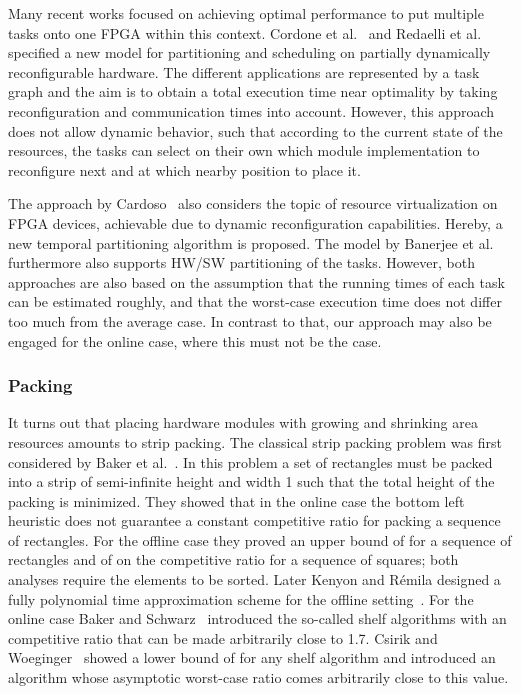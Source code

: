 \documentclass[10pt,journal]{IEEEtran}
\begin{document}
Many recent works focused on achieving optimal performance to put
multiple tasks onto one FPGA within this context.
Cordone et al.~\cite{crrss-pstgp-09} and
Redaelli et al.~\cite{rss-tscpa-08} specified a new model for
partitioning and scheduling on partially dynamically reconfigurable
hardware. The different applications are represented by a
task graph and the aim is to obtain a total execution time near
optimality by taking reconfiguration and communication times into
account. However, this approach does not allow dynamic behavior, such
that according to the current state of the resources, the tasks can
select on their own which module implementation to reconfigure next
and at which nearby position to place it.

The approach by Cardoso~\cite{c-ctpsf-03}  also considers the topic of
resource  virtualization on  FPGA devices,  achievable due  to dynamic
reconfiguration  capabilities.  Hereby,  a new  temporal  partitioning
algorithm    is     proposed.    The    model     by    Banerjee    et
al.~\cite{bbd-ipchs-06}  furthermore also supports  HW/SW partitioning
of  the  tasks.  However,  both  approaches  are  also  based  on  the
assumption  that the  running  times  of each  task  can be  estimated
roughly, and  that the worst-case  execution time does not  differ too
much from the average case. In contrast to that, our approach may also
be engaged for the online case, where this must not be the case.

\subsubsection{Packing}

It turns out that placing hardware modules with growing and shrinking
area resources amounts to strip packing. The classical strip packing
problem was first considered by Baker et al.~\cite{bcr-optd-80}. In
this problem a set of rectangles must be packed into a strip of
semi-infinite height and width 1 such that the total height of the
packing is minimized. They showed that in the online case the bottom
left heuristic does not guarantee a constant competitive
ratio for packing a sequence of rectangles.  For the offline case they proved
an upper bound of  for a sequence of rectangles and of  on the
competitive ratio for a sequence of squares; both analyses require the
elements to be sorted. Later Kenyon and R{\'e}mila designed a fully
polynomial time approximation scheme for the offline
setting~\cite{kr-asp-96}. For the online case Baker and
Schwarz~\cite{BakSch83} introduced the so-called shelf algorithms with
an competitive ratio that can be made arbitrarily close to 1.7. Csirik
and Woeginger~\cite{cw-saosp-97} showed a lower bound of  for
any shelf algorithm and introduced an algorithm whose asymptotic
worst-case ratio comes arbitrarily close to this value.
\end{document}
